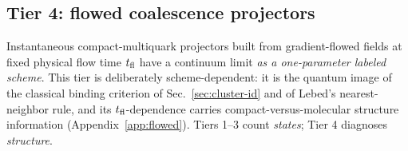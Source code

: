 \subsection{Tier 4: flowed coalescence projectors}
\label{sec:tier4}

Instantaneous compact-multiquark projectors built from gradient-flowed
fields \cite{Luscher:2010iy,Makino:2014taa} at fixed physical flow time
$t_{\rm fl}$ have a continuum limit \emph{as a one-parameter labeled
scheme}.  This tier is deliberately scheme-dependent: it is the quantum
image of the classical binding criterion of Sec.~\ref{sec:cluster-id} and
of Lebed's nearest-neighbor rule, and its $t_{\rm fl}$-dependence carries
compact-versus-molecular structure information
(Appendix~\ref{app:flowed}).  Tiers 1--3 count \emph{states}; Tier 4
diagnoses \emph{structure}.
